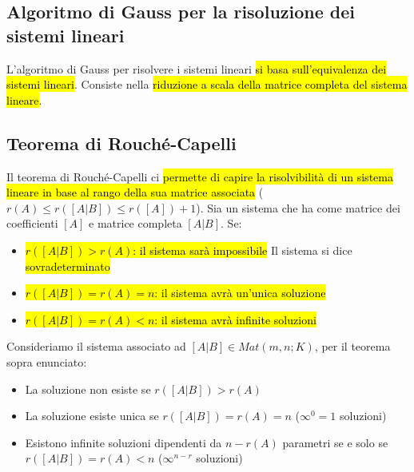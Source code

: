 \subsection{Algoritmo di Gauss per la risoluzione dei sistemi lineari}
L'algoritmo di Gauss per risolvere i sistemi lineari \hl{si basa sull'equivalenza
dei sistemi lineari}. Consiste nella \hl{riduzione a scala della matrice completa
del sistema lineare}.

\subsection{Teorema di Rouché-Capelli}
Il teorema di Rouché-Capelli ci \hl{permette di capire la risolvibilità di un sistema
lineare in base al rango della sua matrice associata}
($r(A) \leq r([A|B]) \leq r([A]) + 1$). Sia un sistema che ha come matrice dei
coefficienti $[A]$ e matrice completa $[A|B]$. Se:
\begin{itemize}
    \item \hl{$r([A|B]) > r(A)$: il sistema sarà impossibile} Il sistema si dice
        \hl{sovradeterminato}
    \item \hl{$r([A|B]) = r(A) = n$: il sistema avrà un'unica soluzione}
    \item \hl{$r([A|B]) = r(A) < n$: il sistema avrà infinite soluzioni}
\end{itemize}

Consideriamo il sistema associato ad $[A|B] \in Mat(m,n;K)$, per il teorema
sopra enunciato:
\begin{itemize}
    \item La soluzione non esiste se $r([A|B]) > r(A)$
    \item La soluzione esiste unica se $r([A|B]) = r(A) = n$ ($\infty^{0} = 1$
        soluzioni)
    \item Esistono infinite soluzioni dipendenti da $n-r(A)$ parametri se e
        solo se $r([A|B]) = r(A) < n$ ($\infty^{n-r}$ soluzioni)
\end{itemize}
